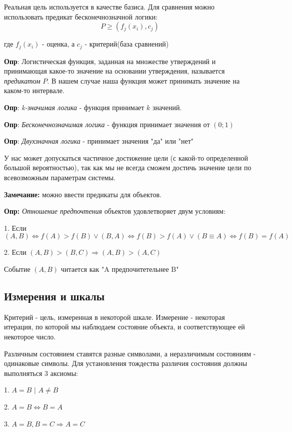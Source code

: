 \documentclass[aps,%
12pt,%
final,%
oneside,
onecolumn,%
musixtex, %
superscriptaddress,%
centertags]{article} %
\begin{document}
Реальная цель используется в качестве базиса. Для сравнения можно использовать предикат бесконечнозначной логики:
$$ P \geq (f_j{(x_i)},c_{j}) $$

где $f_j{(x_i)}$ - оценка, а $c_j$ - критерий(база сравнений)

\textbf{Опр}: Логистическая функция, заданная на множестве утверждений и принимающая какое-то значение на основании утверждения, называется \textit{предикатом} $P$. В нашем случае наша функция может принимать значение на каком-то интервале.

\textbf{Опр}: \textit{k-значимая логика} - функция принимает $k$ значений.

\textbf{Опр}: \textit{Бесконечнозначимая логика} - функция принимает значения от $(0;1)$

\textbf{Опр}: \textit{Двухзначная логика} - принимает значения "да" или "нет"

У нас может допускаться частичное достижение цели (с какой-то определенной большой вероятностью), так как мы не всегда сможем достичь значение цели по всевозможным параметрам системы.

\textbf{Замечание:} можно ввести предикаты для объектов.
\newpage

\textbf{Опр:} \textit{Отношение предпочтения} объектов удовлетворяет двум условиям:

1. Если $(A,B) \Leftrightarrow f(A) > f(B) \vee (B,A) \Leftrightarrow f(B) > f(A) \vee (B \equiv A) \Leftrightarrow f(B) = f(A) $

2. Если $(A,B) > (B,C) \Rightarrow (A,B) > (A,C) $

Событие $(A,B)$ читается как "A предпочитетельнее B"

\subsection{Измерения и шкалы}

Критерий - цель, измеренная в некоторой шкале. Измерение - некоторая итерация, по которой мы наблюдаем состояние объекта, и соответствующее ей некоторое число.

Различным состоянием ставятся разные символами, а неразличимым состояниям - одинаковые символы. Для установления тождества различия состояния должны выполняться 3 аксиомы:

1. $ A = B \text{ | } A \neq B $

2. $ A = B \Leftrightarrow B=A $

3. $ A=B, B=C \Rightarrow A = C$ 
\end{document}
